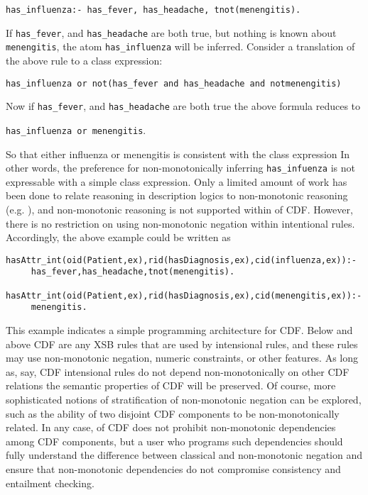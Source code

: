 {\tt has\_influenza:- has\_fever, has\_headache, tnot(menengitis). }

If {\tt has\_fever}, and {\tt has\_headache} are both true, but
nothing is known about {\tt menengitis}, the atom {\tt has\_influenza}
will be inferred.  Consider a translation of the above rule to a class
expression: 

{\tt has\_influenza or not(has\_fever and  has\_headache and notmenengitis) }

Now if {\tt has\_fever}, and {\tt has\_headache} are both true the
above formula reduces to 

{\tt has\_influenza or  menengitis}.

So that either influenza or menengitis is consistent with the class
expression In other words, the preference for non-monotonically
inferring {\tt has\_infuenza} is not expressable with a simple class
expression.  Only a limited amount of work has been done to relate
reasoning in description logics to non-monotonic reasoning
(e.g. \cite{BaaH95}), and non-monotonic reasoning is not supported
within \version{} of CDF.  However, there is no restriction on using
non-monotonic negation within intentional rules.  Accordingly, the
above example could be written as
%
\begin{verbatim}
hasAttr_int(oid(Patient,ex),rid(hasDiagnosis,ex),cid(influenza,ex)):-
     has_fever,has_headache,tnot(menengitis).

hasAttr_int(oid(Patient,ex),rid(hasDiagnosis,ex),cid(menengitis,ex)):-
     menengitis.
\end{verbatim}
%
This example indicates a simple programming architecture for CDF.
Below and above CDF are any XSB rules that are used by intensional
rules, and these rules may use non-monotonic negation, numeric
constraints, or other features.  As long as, say, CDF intensional
rules do not depend non-monotonically on other CDF relations the
semantic properties of CDF will be preserved.  Of course, more
sophisticated notions of stratification of non-monotonic negation can
be explored, such as the ability of two disjoint CDF components to be
non-monotonically related.  In any case, \version{} of CDF does not
prohibit non-monotonic dependencies among CDF components, but a user
who programs such dependencies should fully understand the difference
between classical and non-monotonic negation and ensure that
non-monotonic dependencies do not compromise consistency and
entailment checking.

